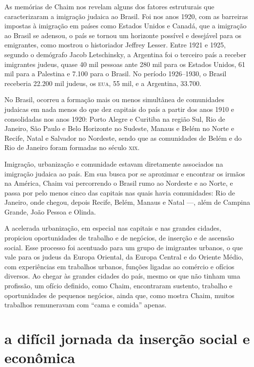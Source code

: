 As memórias de Chaim nos revelam alguns dos fatores estruturais que
caracterizaram a imigração judaica ao Brasil. Foi nos anos 1920, com as
barreiras impostas à imigração em países como Estados Unidos e Canadá,
que a imigração ao Brasil se adensou, o país se tornou um horizonte
possível e desejável para os emigrantes, como mostrou o historiador
Jeffrey Lesser. Entre 1921 e 1925, segundo o demógrafo Jacob
Letschinsky, a Argentina foi o terceiro país a receber imigrantes
judeus, quase 40 mil pessoas ante 280 mil para os Estados Unidos, 61 mil
para a Palestina e 7.100 para o Brasil. No período 1926--1930, o Brasil
receberia 22.200 mil judeus, os \textsc{eua}, 55 mil, e a Argentina, 33.700.

No Brasil, ocorreu a formação mais ou menos simultânea de comunidades
judaicas em nada menos do que dez capitais do país a partir dos anos
1910 e consolidadas nos anos 1920: Porto Alegre e Curitiba na região
Sul, Rio de Janeiro, São Paulo e Belo Horizonte no Sudeste, Manaus e
Belém no Norte e Recife, Natal e Salvador no Nordeste, sendo que as
comunidades de Belém e do Rio de Janeiro foram formadas no século \textsc{xix}.

Imigração, urbanização e comunidade estavam diretamente associados na
imigração judaica ao país. Em sua busca por se aproximar e encontrar os
irmãos na América, Chaim vai percorrendo o Brasil rumo ao Nordeste e ao
Norte, e passa por pelo menos cinco das capitais nas quais havia
comunidades: Rio de Janeiro, onde chegou, depois Recife, Belém, Manaus e
Natal ---, além de Campina Grande, João Pessoa e Olinda.

A acelerada urbanização, em especial nas capitais e nas grandes cidades,
propiciou oportunidades de trabalho e de negócios, de inserção e de
ascensão social. Esse processo foi acentuado para um grupo de imigrantes
urbanos, o que vale para os judeus da Europa Oriental, da Europa Central
e do Oriente Médio, com experiências em trabalhos urbanos, funções
ligadas ao comércio e ofícios diversos. Ao chegar às grandes cidades do
país, mesmo os que não tinham uma profissão, um ofício definido, como
Chaim, encontraram sustento, trabalho e oportunidades de pequenos
negócios, ainda que, como mostra Chaim, muitos trabalhos remuneravam com
``cama e comida'' apenas.

\section{a difícil jornada da inserção social e econômica}

